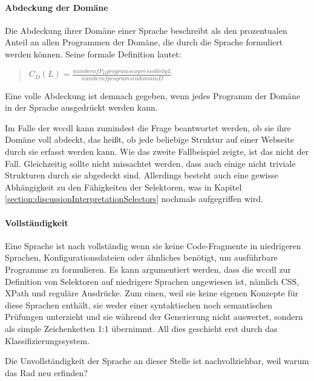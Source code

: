 
    \paragraph{Abdeckung der Domäne}
    Die Abdeckung ihrer Domäne einer Sprache beschreibt
    \citet[Kapitel 4.2]{voelter:DslEngineering} als den
    prozentualen Anteil an allen Programmen der Domäne,
    die durch die Sprache formuliert werden können.
    Seine formale Definition lautet:

    \begin{quote}
        $C_D(L) = \frac{number of P_D programs expressable by L}{number of programs in domain D}$
    \end{quote}

    Eine volle Abdeckung ist demnach gegeben,
    wenn jedes Programm der Domäne in der Sprache ausgedrückt werden kann.

    Im Falle der \gls{wccdl} kann zumindest die Frage beantwortet werden,
    ob sie ihre Domäne voll abdeckt, das heißt, ob jede beliebige Struktur auf einer Webseite
    durch sie erfasst werden kann.
    Wie das zweite Fallbeispiel zeigte, ist das nicht der Fall.
    Gleichzeitig sollte nicht missachtet werden,
    dass auch einige nicht triviale Strukturen durch sie abgedeckt sind.
    Allerdings besteht auch eine gewisse Abhängigkeit zu den Fähigkeiten der Selektoren,
    was in Kapitel \ref{section:discussionInterpretationSelectors}
    nochmals aufgegriffen wird.

    \paragraph{Vollständigkeit}
    Eine Sprache ist nach \citet[Kapitel 4.5]{voelter:DslEngineering}
    vollständig wenn sie keine Code-Fragmente in niedrigeren Sprachen,
    Konfigurationsdateien oder ähnliches benötigt,
    um ausführbare Programme zu formulieren.
    Es kann argumentiert werden, dass die \gls{wccdl} zur Definition von
    Selektoren auf niedrigere Sprachen angewiesen ist,
    nämlich CSS, XPath und reguläre Ausdrücke.
    Zum einen, weil sie keine eigenen Konzepte für diese Sprachen enthält,
    sie weder einer syntaktischen noch semantischen Prüfungen unterzieht
    und sie während der Generierung nicht auswertet,
    sondern als simple Zeichenketten 1:1 übernimmt.
    All dies geschieht erst durch das Klassifizierungssystem.

    Die Unvollständigkeit der Sprache an dieser Stelle ist nachvollziehbar,
    weil warum das Rad neu erfinden?

